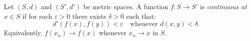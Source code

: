 Let $(S, d)$ and $(S', d')$ be metric spaces. A function $f: S \to S'$ is \textit{continuous at} $x \in S$ if for each $\varepsilon > 0$ there exists $\delta > 0$ such that:
\[
d'(f(x), f(y)) < \varepsilon \quad \text{whenever } d(x, y) < \delta.
\]
Equivalently, $f(x_n) \to f(x)$ whenever $x_n \to x$ in $S$.
